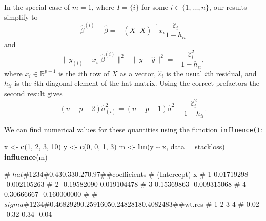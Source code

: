 \documentclass[
  a4paper,
]{article}
\newenvironment{Shaded}{\begin{snugshade}}{\end{snugshade}}
\newcommand{\AttributeTok}[1]{\textcolor[rgb]{0.13,0.29,0.53}{#1}}
\newcommand{\DecValTok}[1]{\textcolor[rgb]{0.00,0.00,0.81}{#1}}
\newcommand{\FunctionTok}[1]{\textcolor[rgb]{0.13,0.29,0.53}{\textbf{#1}}}
\newcommand{\NormalTok}[1]{#1}
\newcommand{\OtherTok}[1]{\textcolor[rgb]{0.56,0.35,0.01}{#1}}
\newcommand{\SpecialCharTok}[1]{\textcolor[rgb]{0.81,0.36,0.00}{\textbf{#1}}}
\theoremstyle{definition}
\theoremstyle{definition}
\theoremstyle{definition}
\theoremstyle{definition}
\theoremstyle{remark}
\begin{document}
In the special case of \(m = 1\), where \(I = \{i\}\) for some
\(i \in \{1, \ldots, n\}\), our results simplify to
\begin{equation}
  \hat\beta^{(i)} - \hat\beta
    = - (X^\top X)^{-1} x_i \frac{\hat\varepsilon_i}{1 - h_{ii}} \label{eq:dbeta-i}
\end{equation}
and
\begin{equation*}
  \| y_{(i)} - x_i^\top \hat\beta^{(i)} \|^2 - \| y - \hat y \|^2
    = - \frac{\hat\varepsilon_i^2}{1 - h_{ii}},
\end{equation*}
where \(x_i \in \mathbb{R}^{p+1}\) is the \(i\)th row of \(X\) as a vector,
\(\hat\varepsilon_i\) is the usual \(i\)th residual,
and \(h_{ii}\) is the \(i\)th diagonal element of the hat matrix.
Using the correct prefactors the second result gives
\begin{equation*}
  (n-p-2) \hat\sigma_{(i)}^2
    = (n-p-1)\hat\sigma^2 - \frac{\hat\varepsilon_i^2}{1 - h_{ii}}.
\end{equation*}

We can find numerical values for these quantities using
the function \texttt{influence()}:

\begin{Shaded}
\begin{Highlighting}[]
\NormalTok{x }\OtherTok{\textless{}{-}} \FunctionTok{c}\NormalTok{(}\DecValTok{1}\NormalTok{, }\DecValTok{2}\NormalTok{, }\DecValTok{3}\NormalTok{, }\DecValTok{10}\NormalTok{)}
\NormalTok{y }\OtherTok{\textless{}{-}} \FunctionTok{c}\NormalTok{(}\DecValTok{0}\NormalTok{, }\DecValTok{0}\NormalTok{, }\DecValTok{1}\NormalTok{, }\DecValTok{3}\NormalTok{)}
\NormalTok{m }\OtherTok{\textless{}{-}} \FunctionTok{lm}\NormalTok{(y }\SpecialCharTok{\textasciitilde{}}\NormalTok{ x, }\AttributeTok{data =}\NormalTok{ stackloss)}
\FunctionTok{influence}\NormalTok{(m)}
\end{Highlighting}
\end{Shaded}

\begin{Shaded}
\begin{Highlighting}[]
\NormalTok{\# $hat}
\NormalTok{\#    1    2    3    4 }
\NormalTok{\# 0.43 0.33 0.27 0.97 }
\NormalTok{\# }
\NormalTok{\# $coefficients}
\NormalTok{\#   (Intercept)            x}
\NormalTok{\# 1  0.01719298 {-}0.002105263}
\NormalTok{\# 2 {-}0.19582090  0.019104478}
\NormalTok{\# 3  0.15369863 {-}0.009315068}
\NormalTok{\# 4  0.30666667 {-}0.160000000}
\NormalTok{\# }
\NormalTok{\# $sigma}
\NormalTok{\#         1         2         3         4 }
\NormalTok{\# 0.4682929 0.2591605 0.2482818 0.4082483 }
\NormalTok{\# }
\NormalTok{\# $wt.res}
\NormalTok{\#     1     2     3     4 }
\NormalTok{\#  0.02 {-}0.32  0.34 {-}0.04}
\end{Highlighting}
\end{Shaded}
\end{document}
